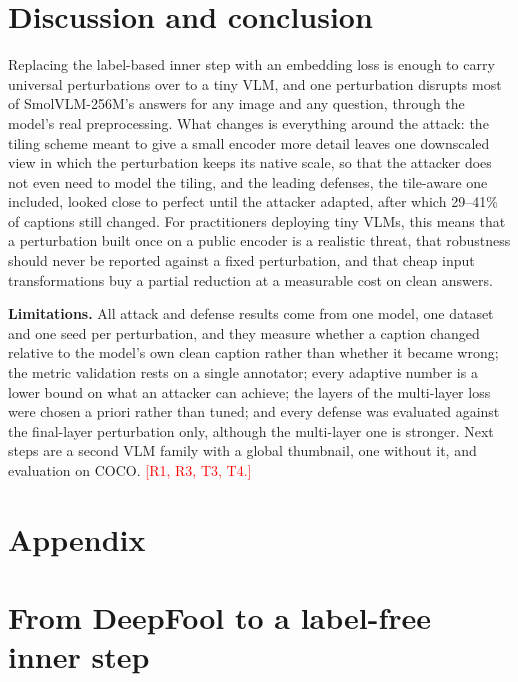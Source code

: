 \documentclass[10pt,twocolumn,letterpaper]{article}
\newcommand{\pend}[1]{\textcolor{red}{[#1]}}
\begin{document}
\section{Discussion and conclusion}
\label{sec:conclusion}

Replacing the label-based inner step with an embedding loss is enough to carry universal perturbations over to a tiny VLM, and one perturbation disrupts most of SmolVLM-256M's answers for any image and any question, through the model's real preprocessing. What changes is everything around the attack: the tiling scheme meant to give a small encoder more detail leaves one downscaled view in which the perturbation keeps its native scale, so that the attacker does not even need to model the tiling, and the leading defenses, the tile-aware one included, looked close to perfect until the attacker adapted, after which 29--41\% of captions still changed. For practitioners deploying tiny VLMs, this means that a perturbation built once on a public encoder is a realistic threat, that robustness should never be reported against a fixed perturbation, and that cheap input transformations buy a partial reduction at a measurable cost on clean answers.

\textbf{Limitations.} All attack and defense results come from one model, one dataset and one seed per perturbation, and they measure whether a caption changed relative to the model's own clean caption rather than whether it became wrong; the metric validation rests on a single annotator; every adaptive number is a lower bound on what an attacker can achieve; the layers of the multi-layer loss were chosen a priori rather than tuned; and every defense was evaluated against the final-layer perturbation only, although the multi-layer one is stronger. Next steps are a second VLM family with a global thumbnail, one without it, and evaluation on COCO. \pend{R1, R3, T3, T4.}

{
    \small
    
    
}

\clearpage
\appendix
\onecolumn
\section*{Appendix}

\section{From DeepFool to a label-free inner step}
\label{app:algo}
\end{document}

